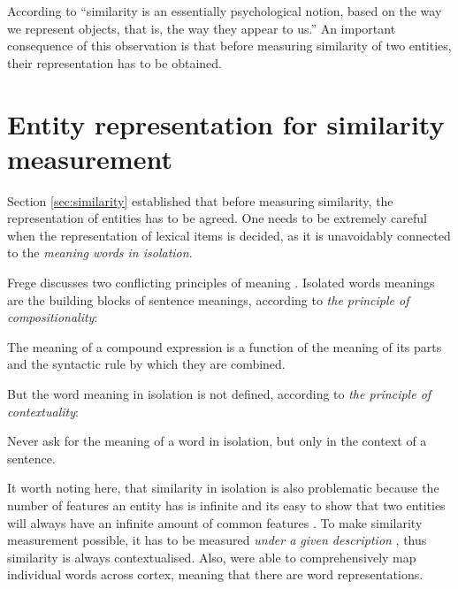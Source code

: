 According to  ``similarity is an essentially psychological notion, based on the way we represent objects, that is, the way they appear to us.'' An important consequence of this observation is that before measuring similarity of two
%
entities,\footnotemark{} their representation has to be obtained.



\section{Entity representation for similarity measurement}
\label{sec:word-meaning}

Section \ref{sec:similarity} established that before measuring similarity, the representation of entities has to be agreed. One needs to be extremely careful when the representation of lexical items is decided, as it is unavoidably connected to the \emph{meaning words in isolation}.


Frege discusses two conflicting principles of meaning \cite{Janssen2001}. Isolated words meanings are the building blocks of sentence meanings, according to \emph{the principle of compositionality}:
\begin{displayquote}
The meaning of a compound expression is a function of the meaning of its parts and the syntactic rule by which they are combined.
\end{displayquote}
But the word meaning in isolation is not defined, according to \emph{the principle of contextuality}:
\begin{displayquote}
Never ask for the meaning of a word in isolation, but only in the context of a sentence.
\end{displayquote}

It worth noting here, that similarity in isolation is also problematic because the number of features an entity has is infinite and its easy to show that two entities will always have an infinite amount of common features \cite{goodman1972problems,hahn1997concepts}. To make similarity measurement possible, it has to be measured \emph{under a given description} \cite{WCS:WCS1282,medin1993respects,Markman1996}, thus similarity is always contextualised. Also,  were able to comprehensively map individual words across cortex, meaning that there are word representations.

